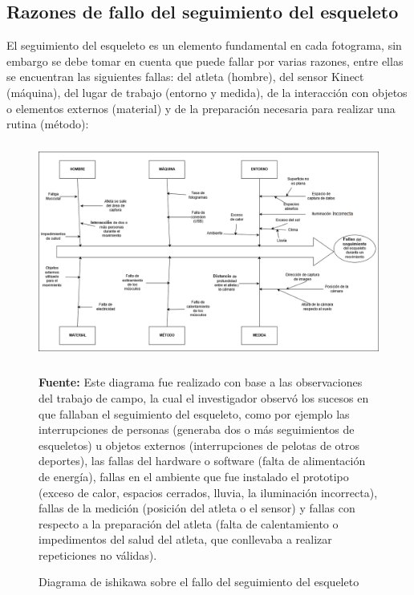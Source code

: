 \begin{landscape}
\section{Razones de fallo del seguimiento del esqueleto}
El seguimiento del esqueleto es un elemento  fundamental en cada fotograma, sin embargo se debe tomar en cuenta que puede fallar por varias razones, entre ellas se encuentran las siguientes fallas: del atleta (hombre), del sensor Kinect (m\'aquina), del lugar de trabajo (entorno y  medida), de la interacci\'on  con objetos o elementos externos (material) y de la preparaci\'on necesaria para realizar una rutina (m\'etodo):
\begin{figure}[H]
	\caption{Diagrama de ishikawa sobre el fallo del seguimiento del esqueleto}
	\label{fig:ishikawa}
	 \begin{center}
	\includegraphics[width=500px,height=270px]{graphics/resultados/Ishi-SeguimientoDeEsqueleto.PNG}	 \\
	\end{center}
	\textbf{Fuente:} Este diagrama fue realizado con base a las observaciones del trabajo de campo, la cual el investigador observ\'o los sucesos en que fallaban el seguimiento del esqueleto, como por ejemplo las interrupciones de personas (generaba dos o m\'as seguimientos de esqueletos) u objetos externos (interrupciones de pelotas de otros deportes), las fallas del hardware o software (falta de alimentaci\'on de energ\'ia), fallas en el ambiente que fue instalado el prototipo (exceso de calor, espacios cerrados, lluvia, la iluminaci\'on incorrecta), fallas de la medici\'on (posici\'on del atleta o el sensor) y  fallas con respecto a la preparaci\'on del atleta (falta de calentamiento o impedimentos del salud del atleta, que conllevaba a realizar repeticiones no v\'alidas).
\end{figure}
\end{landscape}
